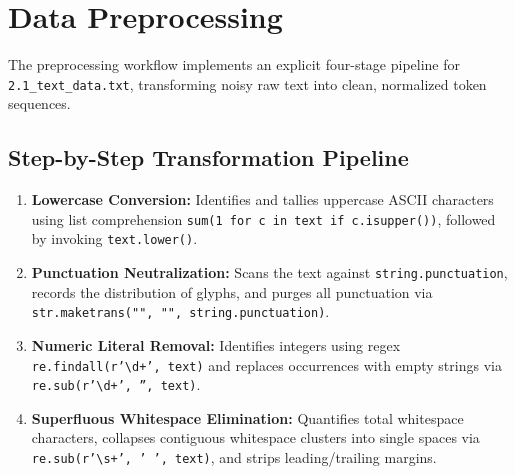 \section{Data Preprocessing}
The preprocessing workflow implements an explicit four-stage pipeline for \texttt{2.1\_text\_data.txt}, transforming noisy raw text into clean, normalized token sequences.

\subsection{Step-by-Step Transformation Pipeline}
\begin{enumerate}
    \item \textbf{Lowercase Conversion:} Identifies and tallies uppercase ASCII characters using list comprehension \texttt{sum(1 for c in text if c.isupper())}, followed by invoking \texttt{text.lower()}.
    \item \textbf{Punctuation Neutralization:} Scans the text against \texttt{string.punctuation}, records the distribution of glyphs, and purges all punctuation via \texttt{str.maketrans("", "", string.punctuation)}.
    \item \textbf{Numeric Literal Removal:} Identifies integers using regex \texttt{re.findall(r'\textbackslash d+', text)} and replaces occurrences with empty strings via \texttt{re.sub(r'\textbackslash d+', '', text)}.
    \item \textbf{Superfluous Whitespace Elimination:} Quantifies total whitespace characters, collapses contiguous whitespace clusters into single spaces via \texttt{re.sub(r'\textbackslash s+', ' ', text)}, and strips leading/trailing margins.
\end{enumerate}

